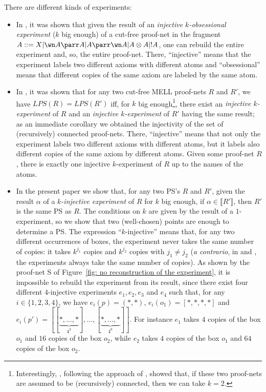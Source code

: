 \documentclass{article}
\theoremstyle{plain}
\newcommand{\contr}{\wn}
\newcommand{\sm}[1]{\llbracket #1 \rrbracket}
\begin{document}
There are different kinds of experiments:
\begin{itemize}
\item In \cite{injectcoh}, it was shown that given the result of an \emph{injective $k$-obsessional experiment} ($k$ big enough) of a cut-free proof-net in the fragment $A ::= X \vert \contr A \parr A \vert A \parr \contr A \vert A \otimes A \vert !A$, one can rebuild the entire experiment and, so, the entire proof-net. There, ``injective'' means that the experiment labels two different axioms with different atoms and ``obsessional'' means that different copies of the same axiom are labeled by the same atom.\item In \cite{LPSinjectivity}, it was shown that for any two cut-free MELL proof-nets $R$ and $R'$, we have $LPS(R) = LPS(R')$ iff, for $k$ big enough\footnote{Interestingly, \cite{k=2}, following the approach of \cite{LPSinjectivity}, showed that, if these two proof-nets are assumed to be (recursively) connected, then we can take $k = 2$.}, there exist an \emph{injective $k$-experiment} of $R$ and an \emph{injective $k$-experiment} of $R'$ having the same result; as an immediate corollary we obtained the injectivity of the set of (recursively) connected proof-nets. There, ``injective'' means that not only the experiment labels two different axioms with different atoms, but it labels also different copies of the same axiom by different atoms. Given some proof-net $R$, there is exactly one injective $k$-experiment of $R$ up to the names of the atoms.
\item In the present paper we show that, for any two PS's $R$ and $R'$, given the result $\alpha$ of a \emph{$k$-injective experiment} of $R$ for $k$ big enough, if $\alpha \in \sm{R'}$, then $R'$ is the same PS as $R$. The conditions on $k$ are given by the result of a $1$-experiment, so we show that two (well-chosen) points are enough to determine a PS. The expression ``$k$-injective'' means that, for any two different occurrences of boxes, the experiment never takes the same number of copies: it takes $k^{j_1}$ copies and $k^{j_2}$ copies with $j_1 \not= j_2$ (\emph{a contrario}, in \cite{injectcoh} and \cite{LPSinjectivity}, the experiments always take the same number of copies). As shown by the proof-net S of Figure~\ref{fig: no reconstruction of the experiment}, it is impossible to rebuild the experiment from its result, since there exist four different $4$-injective experiments $e_1, e_2, e_3$ and $e_4$ such that, for any $i \in \{ 1, 2, 3, 4 \}$, we have $e_i(p) = (\ast, \ast)$, $e_i(o_1) = [\ast, \ast, \ast, \ast]$ and $e_i(p') = [[\underbrace{\ast, \ldots, \ast}_{4^2}], \ldots, [\underbrace{\ast, \ldots, \ast}_{4^6}]]$. For instance $e_1$ takes $4$ copies of the box $o_1$ and $16$ copies of the box $o_2$, while $e_2$ takes $4$ copies of the box $o_1$ and $64$ copies of the box $o_2$.
\end{itemize}
\end{document}
